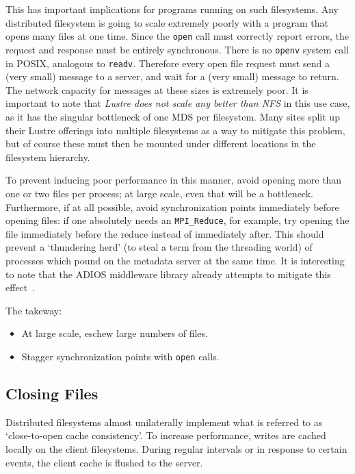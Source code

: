 This has important implications for programs running on such
filesystems.  Any distributed filesystem is going to scale extremely
poorly with a program that opens many files at one time.  Since the
\verb!open! call must correctly report errors, the request and response
must be entirely synchronous.  There is no \verb!openv! system call in
POSIX, analogous to \verb!readv!.  Therefore every open file request
must send a (very small) message to a server, and wait for a (very
small) message to return.  The network capacity for messages at these
sizes is extremely poor.  It is important to note that \emph{Lustre
does not scale any better than NFS} in this use case, as it has the
singular bottleneck of one MDS per filesystem.  Many sites split up
their Lustre offerings into multiple filesystems as a way to mitigate
this problem, but of course these must then be mounted under different
locations in the filesystem hierarchy.

To prevent inducing poor performance in this manner, avoid opening
more than one or two files per process; at large scale,
even that will be a bottleneck.  Furthermore, if at all possible,
avoid synchronization points immediately before opening files: if one
absolutely needs an \verb!MPI_Reduce!, for example, try opening the
file immediately before the reduce instead of immediately after.  This
should prevent a `thundering herd' (to steal a term from the threading
world) of processes which pound on the metadata server at the same
time.  It is interesting to note that the ADIOS middleware library
already attempts to mitigate this effect~\cite{ADIOS:Manual}.

The takeway:

\begin{itemize}
  \item At large scale, eschew large numbers of files.
  \item Stagger synchronization points with \verb!open! calls.
\end{itemize}

\subsection{Closing Files}

Distributed filesystems almost unilaterally implement what is referred
to as `close-to-open cache consistency'.  To increase performance,
writes are cached locally on the client filesystems.  During regular
intervals or in response to certain events, the client cache is flushed
to the server.

